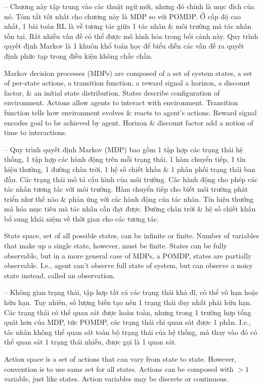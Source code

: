 \documentclass{article}
\begin{document}
\begin{itemize}
\begin{itemize}
        -- Chương này tập trung vào các thuật ngữ mới, nhưng đó chính là mục đích của nó. Tóm tắt tốt nhất cho chương này là MDP so với POMDP. Ở cấp độ cao nhất, 1 bài toán RL là về tương tác giữa 1 tác nhân \& môi trường mà tác nhân tồn tại. Rất nhiều vấn đề có thể được mô hình hóa trong bối cảnh này. Quy trình quyết định Markov là 1 khuôn khổ toán học để biểu diễn các vấn đề ra quyết định phức tạp trong điều kiện không chắc chắn.

        Markov decision processes (MDPs) are composed of a set of system states, a set of per-state actions, a transition function, a reward signal a horizon, a discount factor, \& an initial state distribution. States describe configuration of environment. Actions allow agents to interact with environment. Transition function tells how environment evolves \& reacts to agent's actions. Reward signal encodes goal to be achieved by agent. Horizon \& discount factor add a notion of time to interactions.

        -- Quy trình quyết định Markov (MDP) bao gồm 1 tập hợp các trạng thái hệ thống, 1 tập hợp các hành động trên mỗi trạng thái, 1 hàm chuyển tiếp, 1 tín hiệu thưởng, 1 đường chân trời, 1 hệ số chiết khấu \& 1 phân phối trạng thái ban đầu. Các trạng thái mô tả cấu hình của môi trường. Các hành động cho phép các tác nhân tương tác với môi trường. Hàm chuyển tiếp cho biết môi trường phát triển như thế nào \& phản ứng với các hành động của tác nhân. Tín hiệu thưởng mã hóa mục tiêu mà tác nhân cần đạt được. Đường chân trời \& hệ số chiết khấu bổ sung khái niệm về thời gian cho các tương tác.

        State space, set of all possible states, can be infinite or finite. Number of variables that make up a single state, however, must be finite. States can be fully observable, but in a more general case of MDPs, a POMDP, states are partially observable. I.e., agent can't observe full state of system, but can observe a noisy state instead, called an observation.

        -- Không gian trạng thái, tập hợp tất cả các trạng thái khả dĩ, có thể vô hạn hoặc hữu hạn. Tuy nhiên, số lượng biến tạo nên 1 trạng thái duy nhất phải hữu hạn. Các trạng thái có thể quan sát được hoàn toàn, nhưng trong 1 trường hợp tổng quát hơn của MDP, tức POMDP, các trạng thái chỉ quan sát được 1 phần. I.e., tác nhân không thể quan sát toàn bộ trạng thái của hệ thống, mà thay vào đó có thể quan sát 1 trạng thái nhiễu, được gọi là 1 quan sát.

        Action space is a set of actions that can vary from state to state. However, convention is to use same set for all states. Actions can be composed with $> 1$ variable, just like states. Action variables may be discrete or continuous.


\end{itemize}
\end{itemize}
\end{document}
